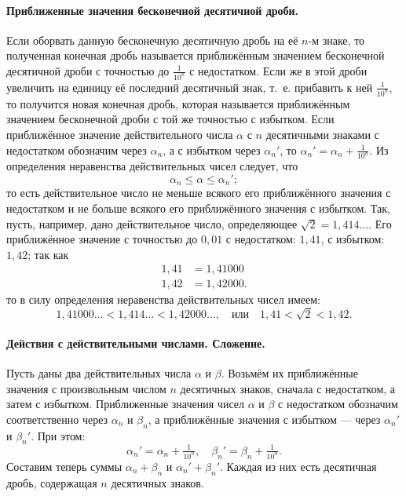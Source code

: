 \documentclass[oneside]{book}
\begin{document}
\paragraph{Приближенные значения бесконечной десятичной дроби.}\label{1938/152}
Если оборвать данную бесконечную десятичную дробь на её $n$-м знаке, то полученная конечная дробь называется приближённым значением бесконечной десятичной дроби с точностью до $\tfrac1{10^n}$ с недостатком.
Если же в этой дроби увеличить на единицу её последний десятичный знак, т.~е.
прибавить к ней $\tfrac1{10^n}$, то получится новая конечная дробь, которая называется приближённым значением бесконечной дроби с той же точностью с избытком.
Если приближённое значение действительного числа $\alpha$ с $n$ десятичными знаками с недостатком обозначим через $\alpha_n$, а с избытком через  $\alpha_n'$, то  $\alpha_n'=\alpha_n+\tfrac1{10^n}$.
Из определения неравенства действительных чисел следует, что 
\[\alpha_n\le \alpha\le\alpha_n';\]
то есть действительное число не меньше всякого его приближённого значения с недостатком и не больше всякого его приближённого значения с избытком. %
Так, пусть, например, дано действительное число, определяющее  $\sqrt{2}  = 1{,}414\dots$.
Его приближённое значение с точностью до $0{,}01$ с недостатком:
$1{,}41$, с избытком:
$1{,}42$;
так как
\begin{align*}
1{,}41 &= 1{,}41000
\\
1{,}42 &= 1{,}42000.
\end{align*}
то в силу определения неравенства действительных чисел имеем:
\[1{,}41000\ldots
< 1{,}414\ldots
< 1{,}42000\ldots,
\quad\text{или}\quad
1{,}41 <  \sqrt{2}  < 1{,}42.\]

\paragraph{Действия с действительными числами. Сложение.}\label{1938/153}

Пусть даны два действительных числа $\alpha$ и $\beta$.
Возьмём их приближённые значения с произвольным числом $n$ десятичных знаков, сначала с недостатком, а затем с избытком.
Приближенные значения чисел $\alpha$ и $\beta$ с недостатком обозначим соответственно через $\alpha_n$ и $\beta_n$, а приближённые значения с избытком — через $\alpha_n'$ и $\beta_n'$.
При этом:
\[\alpha_n'=\alpha_n +\tfrac1{10^n},
\quad
 \beta_n'=\beta_n +\tfrac1{10^n}.
\]
Составим теперь суммы $\alpha_n+\beta_n$ и $\alpha_n'+ \beta_n'$.
Каждая из них есть десятичная дробь, содержащая $n$ десятичных знаков.
\end{document}
